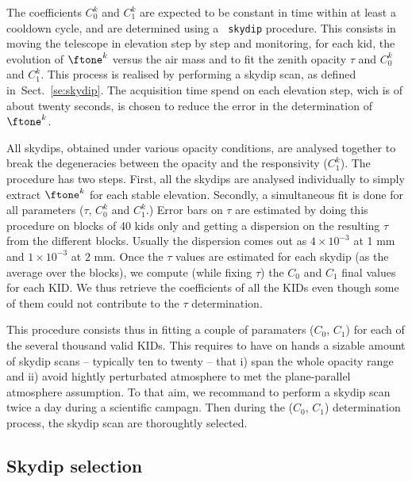 The coefficients $C_0^k$ and $C_1^k$ are expected to be constant in
time within at least a cooldown cycle, and are determined using a {\tt
skydip} procedure. This consists in moving the telescope in elevation
step by step and monitoring, for each kid, the evolution of $\ftone^k$
versus the air mass and to fit the zenith opacity $\tau$ and $C_0^k$
and $C_1^k$. This process is realised by performing a skydip scan, as
defined in~Sect.~\ref{se:skydip}. The acquisition time spend on each
elevation step, wich is of about twenty seconds, is chosen to reduce
the error in the determination of $\ftone^k$.

All skydips, obtained under various opacity
conditions, are analysed together to break the degeneracies between
the opacity and the responsivity ($C_1^k$). The procedure has two steps.
First, all the skydips are analysed individually to simply extract
$\ftone^k$ for each stable elevation. Secondly, a simultaneous fit is done
for all 
parameters ($\tau$, $C_0^k$ and $C_1^k$.)
Error bars on $\tau$ are estimated by doing
this procedure on blocks of 40 kids only and getting a dispersion on the
resulting $\tau$ from the different blocks. Usually the dispersion comes out as
$4\times 10^{-3}$ at 1 mm and $1\times 10^{-3}$ at 2 mm. Once the $\tau$ values
are estimated for each skydip (as the average over the blocks), we compute
(while fixing $\tau$) the $C_0$ and $C_1$ final values for each KID. We thus
retrieve the coefficients of all the KIDs even though some of them could not
contribute to the $\tau$ determination.

This procedure consists thus in fitting a couple of paramaters ($C_0$,
$C_1$) for each of the several thousand valid KIDs. This requires to
have on hands a sizable amount of skydip scans -- typically ten to
twenty -- that i) span the whole opacity range and ii) avoid hightly
perturbated atmosphere to met the plane-parallel atmosphere
assumption. To that aim, we recommand to perform a skydip scan twice a
day during a scientific campagn. Then during the ($C_0$, $C_1$)
determination process, the skydip scan are thoroughtly selected.

   
\subsection{Skydip selection}


